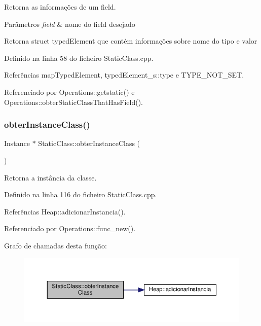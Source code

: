 Retorna as informações de um field. 


\begin{DoxyParams}{Parâmetros}
{\em field} & nome do field desejado \\
\hline
\end{DoxyParams}
\begin{DoxyReturn}{Retorna}
struct typed\+Element que contém informações sobre nome do tipo e valor 
\end{DoxyReturn}


Definido na linha 58 do ficheiro Static\+Class.\+cpp.



Referências map\+Typed\+Element, typed\+Element\+\_\+s\+::type e T\+Y\+P\+E\+\_\+\+N\+O\+T\+\_\+\+S\+ET.



Referenciado por Operations\+::getstatic() e Operations\+::obter\+Static\+Class\+That\+Has\+Field().

\mbox{\label{classStaticClass_a2990aa887bcb06eaec53afe467e361ef}} 
\subsubsection{\texorpdfstring{obter\+Instance\+Class()}{obterInstanceClass()}}
{\footnotesize\ttfamily Instance $\ast$ Static\+Class\+::obter\+Instance\+Class (\begin{DoxyParamCaption}{ }\end{DoxyParamCaption})}



Retorna a instância da classe. 



Definido na linha 116 do ficheiro Static\+Class.\+cpp.



Referências Heap\+::adicionar\+Instancia().



Referenciado por Operations\+::func\+\_\+new().

Grafo de chamadas desta função\+:\nopagebreak
\begin{figure}[H]
\begin{center}
\leavevmode
\includegraphics[width=350pt]{classStaticClass_a2990aa887bcb06eaec53afe467e361ef_cgraph}
\end{center}
\end{figure}


